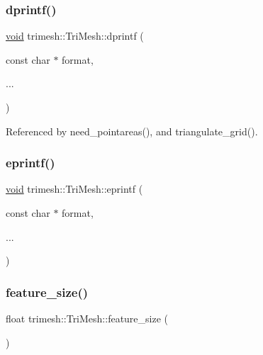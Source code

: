 \mbox{\label{classtrimesh_1_1TriMesh_a772d07c46c272894e7feba9c1ba12e88}} 
\subsubsection{\texorpdfstring{dprintf()}{dprintf()}}
{\footnotesize\ttfamily \hyperlink{namespacetrimesh_a784ddfd979e1c579bda795a8edfc3f43}{void} trimesh\+::\+Tri\+Mesh\+::dprintf (\begin{DoxyParamCaption}\item[{const char $\ast$}]{format,  }\item[{}]{... }\end{DoxyParamCaption})\hspace{0.3cm}{\ttfamily [static]}}



Referenced by need\+\_\+pointareas(), and triangulate\+\_\+grid().

\mbox{\label{classtrimesh_1_1TriMesh_a441d76c8ced667acd4e9f8ea15c1b304}} 
\subsubsection{\texorpdfstring{eprintf()}{eprintf()}}
{\footnotesize\ttfamily \hyperlink{namespacetrimesh_a784ddfd979e1c579bda795a8edfc3f43}{void} trimesh\+::\+Tri\+Mesh\+::eprintf (\begin{DoxyParamCaption}\item[{const char $\ast$}]{format,  }\item[{}]{... }\end{DoxyParamCaption})\hspace{0.3cm}{\ttfamily [static]}}

\mbox{\label{classtrimesh_1_1TriMesh_a5e39bed326efb7c8a3ad122b9b371456}} 
\subsubsection{\texorpdfstring{feature\+\_\+size()}{feature\_size()}}
{\footnotesize\ttfamily float trimesh\+::\+Tri\+Mesh\+::feature\+\_\+size (\begin{DoxyParamCaption}{ }\end{DoxyParamCaption})}



